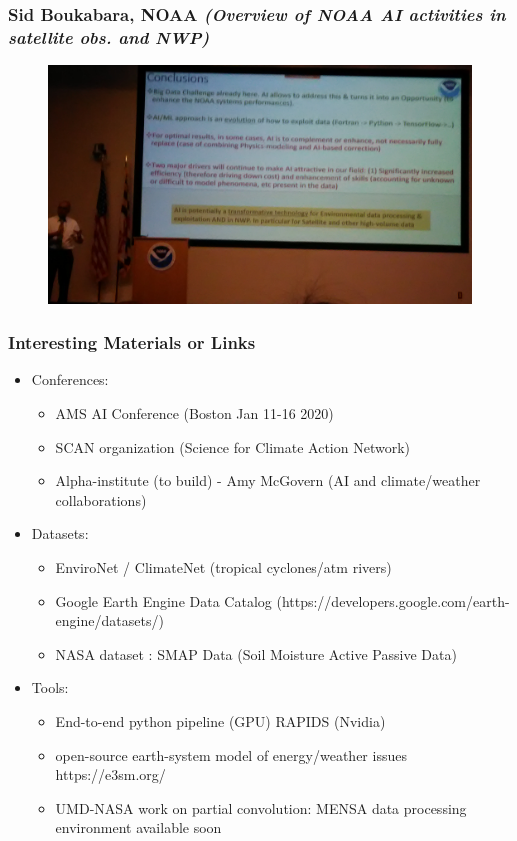 \documentclass{beamer}
\begin{document}
\begin{frame}
\frametitle{Sid Boukabara, NOAA \textit{(Overview of NOAA AI activities in satellite obs. and NWP)}}
\begin{figure}
	\includegraphics[width=\linewidth]{figs/P_20190423_111607.jpg}
\end{figure}
\end{frame}



\begin{frame}
\frametitle{Interesting Materials or Links}

\begin{itemize}
	\item Conferences: 
	\begin{itemize}
	\item AMS AI Conference (Boston Jan 11-16 2020)
	\item SCAN organization (Science for Climate Action Network)
	\item Alpha-institute (to build) - Amy McGovern (AI and climate/weather collaborations)
\end{itemize}		
	\item Datasets: 
	\begin{itemize}
	\item EnviroNet / ClimateNet (tropical cyclones/atm rivers)
	\item Google Earth Engine Data Catalog (https://developers.google.com/earth-engine/datasets/)
	\item NASA dataset : SMAP Data (Soil Moisture Active Passive Data)
	\end{itemize}		
	
	\item Tools: 
	\begin{itemize}
	\item End-to-end python pipeline (GPU) RAPIDS (Nvidia)
	\item open-source earth-system model of energy/weather issues https://e3sm.org/
	\item UMD-NASA work on partial convolution: MENSA data processing environment available soon
	\end{itemize}
	
\end{itemize}
\end{frame}
\end{document}
